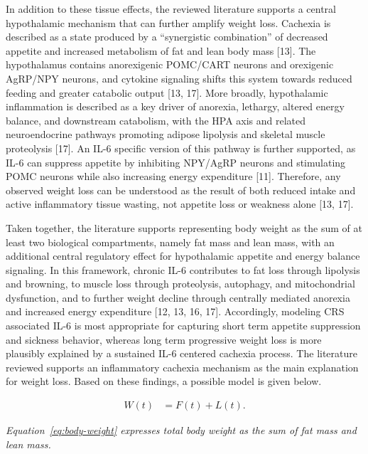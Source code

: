 \documentclass[11pt]{article}
\begin{document}
In addition to these tissue effects, the reviewed literature supports a central hypothalamic mechanism that can further amplify weight loss. Cachexia is described as a state produced by a “synergistic combination” of decreased appetite and increased metabolism of fat and lean body mass [13]. The hypothalamus contains anorexigenic POMC/CART neurons and orexigenic AgRP/NPY neurons, and cytokine signaling shifts this system towards reduced feeding and greater catabolic output [13, 17]. More broadly, hypothalamic inflammation is described as a key driver of anorexia, lethargy, altered energy balance, and downstream catabolism, with the HPA axis and related neuroendocrine pathways promoting adipose lipolysis and skeletal muscle proteolysis [17]. An IL-6 specific version of this pathway is further supported, as IL-6 can suppress appetite by inhibiting NPY/AgRP neurons and stimulating POMC neurons while also increasing energy expenditure [11]. Therefore, any observed weight loss can be understood as the result of both reduced intake and active inflammatory tissue wasting, not appetite loss or weakness alone [13, 17].
\par\medskip

Taken together, the literature supports representing body weight as the sum of at least two biological compartments, namely fat mass and lean mass, with an additional central regulatory effect for hypothalamic appetite and energy balance signaling. In this framework, chronic IL-6 contributes to fat loss through lipolysis and browning, to muscle loss through proteolysis, autophagy, and mitochondrial dysfunction, and to further weight decline through centrally mediated anorexia and increased energy expenditure [12, 13, 16, 17]. Accordingly, modeling CRS associated IL-6 is most appropriate for capturing short term appetite suppression and sickness behavior, whereas long term progressive weight loss is more plausibly explained by a sustained IL-6 centered cachexia process. The literature reviewed supports an inflammatory cachexia mechanism as the main explanation for weight loss. Based on these findings, a possible model is given below.
\par\medskip


\begin{equation}
\begin{aligned}
W(t) &= F(t)+L(t).
\end{aligned}
\label{eq:body-weight}
\end{equation}

\emph{Equation~\ref{eq:body-weight} expresses total body weight as the sum of fat mass and lean mass.}
\par\medskip
\end{document}
